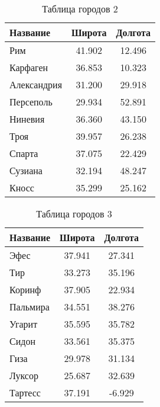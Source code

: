 \begin{table}[H]
\centering
\caption{Таблица городов 2\label{tab:cities_2}}
\begin{tabular}{|l|c|c|}
\hline
\textbf{Название}         & \textbf{Широта} & \textbf{Долгота} \\ \hline
Рим                       & 41.902          & 12.496           \\ \hline
Карфаген                  & 36.853          & 10.323           \\ \hline
Александрия               & 31.200          & 29.918           \\ \hline
Персеполь                 & 29.934          & 52.891           \\ \hline
Ниневия                   & 36.360          & 43.150           \\ \hline
Троя                      & 39.957          & 26.238           \\ \hline
Спарта                    & 37.075          & 22.429           \\ \hline
Сузиана                   & 32.194          & 48.247           \\ \hline
Кносс                     & 35.299          & 25.162           \\ \hline
\end{tabular}
\end{table}

\begin{table}[H]
\centering
\caption{Таблица городов 3\label{tab:cities_3}}
\begin{tabular}{|l|c|c|}
\hline
\textbf{Название}         & \textbf{Широта} & \textbf{Долгота} \\ \hline
Эфес                      & 37.941          & 27.341           \\ \hline
Тир                       & 33.273          & 35.196           \\ \hline
Коринф                    & 37.905          & 22.934           \\ \hline
Пальмира                  & 34.551          & 38.276           \\ \hline
Угарит                    & 35.595          & 35.782           \\ \hline
Сидон                     & 33.561          & 35.375           \\ \hline
Гиза                      & 29.978          & 31.134           \\ \hline
Луксор                    & 25.687          & 32.639           \\ \hline
Тартесс                   & 37.191          & -6.929           \\ \hline
\end{tabular}
\end{table}

